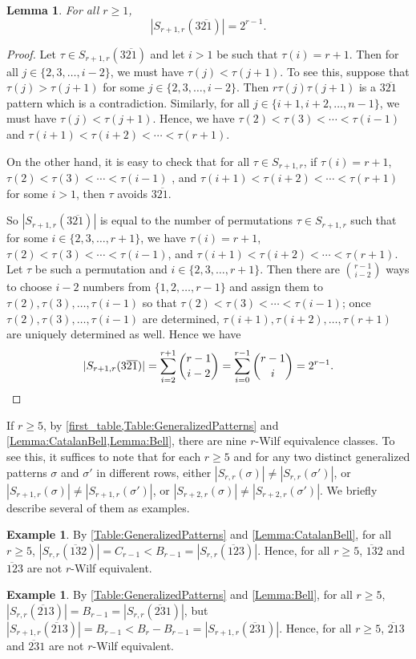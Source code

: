 \documentclass[11pt]{article}
\newtheorem{lemma}[theorem]{Lemma}
\theoremstyle{definition}
\newtheorem{example}[theorem]{Example}
\numberwithin{equation}{section}
\begin{document}
\begin{lemma}
For all $r\geq1$, \[|S_{r+1,r}(3\overline{21})|=2^{r-1}.\]
\end{lemma}
\begin{proof}
Let $\tau\in S_{r+1,r}(3\overline{21})$ and let $i>1$ be such that $\tau(i)=r+1$. Then for all $j\in\{2,3,\ldots,i-2\}$, we must have $\tau(j)<\tau(j+1)$. To see this, suppose that $\tau(j)>\tau(j+1)$ for some $j\in\{2,3,\ldots,i-2\}$. Then $r\tau(j)\tau(j+1)$ is a $3\overline{21}$ pattern which is a contradiction. Similarly, for all $j\in\{i+1,i+2,\ldots,n-1\}$, we must have $\tau(j)<\tau(j+1)$. Hence, we have $\tau(2)<\tau(3)<\cdots<\tau(i-1)$ and $\tau(i+1)<\tau(i+2)<\cdots<\tau(r+1)$. 

On the other hand, it is easy to check that for all $\tau\in S_{r+1,r}$, if $\tau(i)=r+1$, $\tau(2)<\tau(3)<\cdots<\tau(i-1)$ , and $\tau(i+1)<\tau(i+2)<\cdots<\tau(r+1)$ for some $i>1$, then $\tau$ avoids $3\overline{21}$. 

So $|S_{r+1,r}(3\overline{21})|$ is equal to the number of permutations $\tau\in S_{r+1,r}$ such that for some $i\in\{2,3,\ldots,r+1\}$, we have $\tau(i)=r+1$, $\tau(2)<\tau(3)<\cdots<\tau(i-1)$, and $\tau(i+1)<\tau(i+2)<\cdots<\tau(r+1)$. Let $\tau$ be such a permutation and $i\in\{2,3,\ldots,r+1\}$. Then there are $\binom{r-1}{i-2}$ ways to choose $i-2$ numbers from $\{1,2,\ldots,r-1\}$ and assign them to $\tau(2),\tau(3),\ldots,\tau(i-1)$ so that $\tau(2)<\tau(3)<\cdots<\tau(i-1)$; once $\tau(2),\tau(3),\ldots,\tau(i-1)$ are determined, $\tau(i+1),\tau(i+2),\ldots,\tau(r+1)$ are uniquely determined as well. Hence we have
\[
|S_{r+1,r}(3\overline{21})|=\sum_{i=2}^{r+1}\binom{r-1}{i-2}=\sum_{i=0}^{r-1}\binom{r-1}{i}=2^{r-1}.\qedhere
\]
\end{proof}

If $r\geq5$, by \cref{first_table,Table:GeneralizedPatterns} and \cref{Lemma:CatalanBell,Lemma:Bell}, there are nine $r$-Wilf equivalence classes. To see this, it suffices to note that for each $r\geq5$ and for any two distinct generalized patterns $\sigma$ and $\sigma'$ in different rows, either $|S_{r,r}(\sigma)|\neq|S_{r,r}(\sigma')|$, or $|S_{r+1,r}(\sigma)|\neq|S_{r+1,r}(\sigma')|$, or $|S_{r+2,r}(\sigma)|\neq|S_{r+2,r}(\sigma')|$. We briefly describe several of them as examples.
\begin{example}
    By \cref{Table:GeneralizedPatterns} and \cref{Lemma:CatalanBell}, for all $r\geq5$, $|S_{r,r}(\overline{13}2)|=C_{r-1}<B_{r-1}=|S_{r,r}(\overline{12}3)|$. Hence, for all $r\geq5$, $\overline{13}2$ and $\overline{12}3$ are not $r$-Wilf equivalent.
\end{example}
\begin{example}
    By \cref{Table:GeneralizedPatterns} and \cref{Lemma:Bell}, for all $r\geq5$, $|S_{r,r}(\overline{21}3)|=B_{r-1}=|S_{r,r}(\overline{23}1)|$, but $|S_{r+1,r}(\overline{21}3)|=B_{r-1}<B_r-B_{r-1}=|S_{r+1,r}(\overline{23}1)|$. Hence, for all $r\geq5$, $\overline{21}3$ and $\overline{23}1$ are not $r$-Wilf equivalent.
\end{example}
\end{document}
